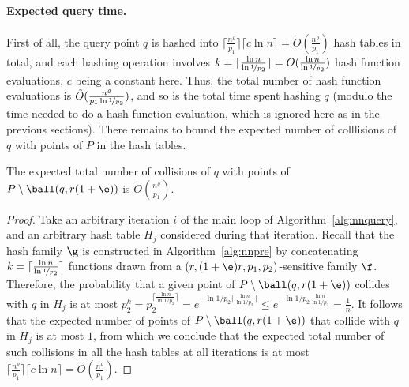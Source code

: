 \paragraph{Expected query time.}
First of all, the query point $q$ is hashed into $\lceil
\frac{n^\varrho}{p_1}\rceil \lceil c\ln n\rceil=\tilde
O(\frac{n^\varrho}{p_1})$ hash tables in total, and each hashing
operation involves $k=\lceil \frac{\ln
  n}{\ln\nicefrac{1}{p_2}}\rceil=O(\frac{\ln n}{\ln
  \nicefrac{1}{p_2}})$ hash function evaluations, $c$ being a constant
here. Thus, the total number of hash function evaluations is $\tilde
O(\frac{n^\varrho}{p_1 \ln\nicefrac{1}{p_2}})$, and so is the total time
spent hashing $q$ (modulo the time needed to do a hash function
evaluation, which is ignored here as in the previous sections). There
remains to bound the expected number of colllisions of $q$ with points
of $P$ in the hash tables.
\begin{lem} \label{lem:falsepos}
The expected total number of collisions of $q$ with points of
$P\setminus \ball(q,r(1+\e))$ is $\tilde O(\frac{n^\varrho}{p_1})$.
\end{lem}
\begin{proof}
 Take an arbitrary iteration $i$ of the main loop of
 Algorithm~\ref{alg:nnquery}, and an arbitrary hash table $H_j$
 considered during that iteration. Recall that the hash family $\g$ is
 constructed in Algorithm~\ref{alg:nnpre} by concatenating
 $k=\lceil\frac{\ln n}{\ln\nicefrac{1}{p_2}}\rceil$ functions drawn
 from a $(r,(1+\e)r,p_1,p_2)$-sensitive family $\f$. Therefore, the
 probability that a given point of $P\setminus \ball(q,r(1+\e))$
 collides with $q$ in $H_j$ is at most $p_2^k = p_2^{\lceil\frac{\ln
     n}{\ln 1/p_2}\rceil} = e^{-\ln 1/p_2 \lceil\frac{\ln n}{\ln
     1/p_2}\rceil} \leq e^{-\ln 1/p_2 \frac{\ln n}{\ln 1/p_2}} =
 \frac{1}{n}$.  It follows that the expected number of points
 of $P\setminus \ball(q,r(1+\e))$ that collide with $q$ in $H_j$ is
 at most $1$, from which we conclude that the expected
 total number of such collisions in all the hash tables at all
 iterations is at most $\lceil \frac{n^\varrho}{p_1}\rceil \lceil
 c\ln n\rceil = \tilde O(\frac{n^\varrho}{p_1})$.
\end{proof}

